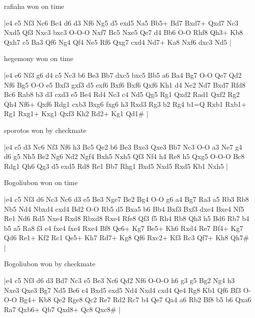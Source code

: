 \showboard

rafiaha won on time

\makegametitle
|e4 e5 Nf3 Nc6 Bc4 d6 d3 Nf6 Ng5 d5 exd5 Na5 Bb5+ Bd7 Bxd7+ Qxd7 Nc3 Nxd5 Qf3 Nxc3 bxc3 O-O-O Nxf7 Bc5 Nxe5 Qe7 d4 Bb6 O-O Rhf8 Qh3+ Kb8 Qxh7 c5 Ba3 Qf6 Ng4 Qf4 Ne5 Rf6 Qxg7 cxd4 Nd7+ Ka8 Nxf6 dxc3 Nd5  |

\showboard

hegemony won on time

\makegametitle
|e4 e6 Nf3 g6 d4 c5 Nc3 b6 Be3 Bb7 dxc5 bxc5 Bb5 a6 Ba4 Bg7 O-O Qe7 Qd2 Nf6 Bg5 O-O e5 Bxf3 gxf3 d5 exf6 Bxf6 Bxf6 Qxf6 Kh1 d4 Ne2 Nd7 Bxd7 Rfd8 Bc6 Rab8 b3 d3 cxd3 e5 Be4 Rd4 Nc3 c4 Nd5 Qg5 Rg1 Qxd2 Rad1 Qxf2 Rg2 Qh4 Nf6+ Qxf6 Rdg1 cxb3 Bxg6 fxg6 h3 Rxd3 Rg3 b2 Rg4 b1=Q Rxb1 Rxb1+ Rg1 Rxg1+ Kxg1 Qxf3 Kh2 Rd2+ Kg1 Qd1\#  |

\showboard

sporotos won by checkmate

\makegametitle
|e4 e5 d3 Nc6 Nf3 Nf6 h3 Bc5 Qe2 b6 Be3 Bxe3 Qxe3 Bb7 Nc3 O-O a3 Ne7 g4 d6 g5 Nh5 Be2 Ng6 Nd2 Ngf4 Bxh5 Nxh5 Qf3 Nf4 h4 Re8 h5 Qxg5 O-O-O Bc8 Rdg1 Qh6 Qg3 d5 exd5 Rd8 Re1 Bb7 Rhg1 Bxd5 Nxd5 Rxd5 Kb1 Nxh5  |

\showboard

Bogoliubon won on time

\makegametitle
|e4 c5 Nf3 d6 Nc3 Nc6 d3 e5 Be3 Nge7 Be2 Bg4 O-O g6 a4 Bg7 Ra3 a5 Rb3 Rb8 Nb5 Nd4 Nbxd4 cxd4 Bd2 O-O Rb5 d5 Bxa5 b6 Bb4 Bxf3 Bxf3 dxe4 Bxe4 Nf5 Re1 Nd6 Rd5 Nxe4 Rxd8 Rbxd8 Rxe4 Rfe8 Qf3 f5 Rh4 Rb8 Qh3 h5 Bd6 Rb7 b4 b5 a5 Ra8 f3 e4 fxe4 fxe4 Rxe4 Bf8 Qe6+ Kg7 Be5+ Kh6 Rxd4 Re7 Bf4+ Kg7 Qd6 Re1+ Kf2 Rc1 Qe5+ Kh7 Rd7+ Kg8 Qf6 Rxc2+ Kf3 Rc3 Qf7+ Kh8 Qh7\#  |

\showboard

Bogoliubon won by checkmate

\makegametitle
|e4 c5 Nf3 d6 d3 Bd7 Nc3 e5 Be3 Nc6 Qd2 Nf6 O-O-O h6 g3 g5 Bg2 Ng4 h3 Nxe3 Qxe3 Bg7 Nd5 Be6 c4 Bxd5 exd5 Nd4 Nxd4 cxd4 Qe4 Rg8 Kb1 Qf6 Bf3 O-O-O Bg4+ Kb8 Qe2 Rge8 Qc2 Re7 Rd2 Rc7 b4 Qe7 Qa4 a6 Rb2 Bf8 b5 b6 Qxa6 Ra7 Qxb6+ Qb7 Qxd8+ Qc8 Qxc8\#  |

